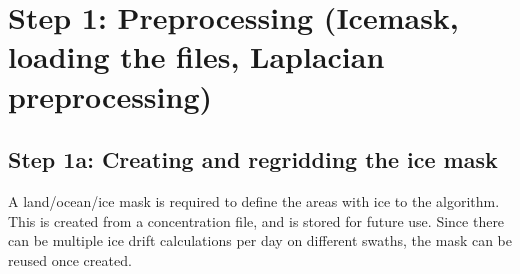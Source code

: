 \documentclass[letterpaper,10pt,english]{jupyterBook}
\begin{document}
\section{Step 1: Pre\sphinxhyphen{}processing (Icemask, loading the files, Laplacian pre\sphinxhyphen{}processing)}
\label{\detokenize{CIMR_L2_Sea_Ice_Drift_algorithm:step-1-pre-processing-icemask-loading-the-files-laplacian-pre-processing}}

\subsection{Step 1a: Creating and regridding the ice mask}
\label{\detokenize{CIMR_L2_Sea_Ice_Drift_algorithm:step-1a-creating-and-regridding-the-ice-mask}}
\sphinxAtStartPar
A land/ocean/ice mask is required to define the areas with ice to the algorithm. This is created from a concentration file, and is stored for future use. Since there can be multiple ice drift calculations per day on different swaths, the mask can be reused once created.
\end{document}
